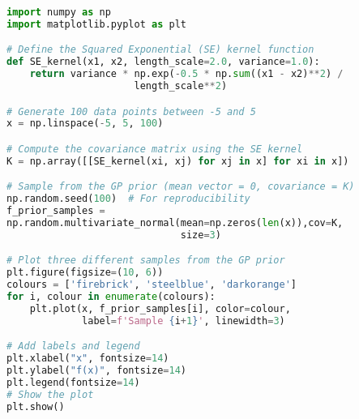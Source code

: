 \documentclass[12pt,a4paper]{article}
\begin{document}
\vspace{10pt}
\begin{lstlisting}[language=python, caption={Code of the Creation of Figure \ref{fig:Prior_samples_plot}}]
import numpy as np
import matplotlib.pyplot as plt

# Define the Squared Exponential (SE) kernel function
def SE_kernel(x1, x2, length_scale=2.0, variance=1.0):
    return variance * np.exp(-0.5 * np.sum((x1 - x2)**2) /
                      length_scale**2)

# Generate 100 data points between -5 and 5
x = np.linspace(-5, 5, 100)

# Compute the covariance matrix using the SE kernel
K = np.array([[SE_kernel(xi, xj) for xj in x] for xi in x])

# Sample from the GP prior (mean vector = 0, covariance = K)
np.random.seed(100)  # For reproducibility
f_prior_samples = 
np.random.multivariate_normal(mean=np.zeros(len(x)),cov=K,
                              size=3)

# Plot three different samples from the GP prior
plt.figure(figsize=(10, 6))
colours = ['firebrick', 'steelblue', 'darkorange']
for i, colour in enumerate(colours):
    plt.plot(x, f_prior_samples[i], color=colour,
             label=f'Sample {i+1}', linewidth=3)

# Add labels and legend
plt.xlabel("x", fontsize=14)
plt.ylabel("f(x)", fontsize=14)
plt.legend(fontsize=14)
# Show the plot
plt.show()
\end{lstlisting}
\end{document}
